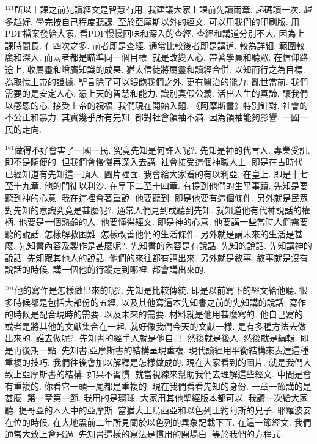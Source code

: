 \documentclass{book}
\begin{document}
$^{121}$所以上課之前先讀經文是智慧有用.
我建議大家上課前先讀兩章.
起碼讀一次.
越多越好.
學完按自己程度聽課.
至於亞摩斯以外的經文.
可以用我們的印刷版.
用PDF檔案發給大家.
看PDF慢慢回味和深入的查經.
查經和講道分別不大.
因為上課時間長.
有四次之多.
前者即是查經.
通常比較後者即是講道.
較為詳細.
範圍較廣和深入.
而兩者都是瞄準同一個目標.
就是改變人心.
帶著學員和聽眾.
在信仰路途上.
收屬靈和增廣知識的成果.
猶太信徒將屬靈和讀經合併.
以知而行之為目標.
為取悅上帝的證據.
聖言除了可以餵飽我們之外.
更有醫治的能力.
亂世當前.
我們需要的是安定人心.
憑上天的智慧和能力.
識別真假公義.
活出人生的真諦.
讓我們以感恩的心.
接受上帝的祝福.
我們現在開始入題.
《阿摩斯書》特別針對.
社會的不公正和暴力.
其實幾乎所有先知.
都對社會領袖不滿.
因為領袖能夠影響.
一國一民的走向.

$^{161}$做得不好會害了一國一民.
究竟先知是何許人呢?.
先知是神的代言人.
專業受訓.
即不是隨便的.
但我們會慢慢再深入去講.
社會接受這個神職人士.
即是在古時代.
已經知道有先知這一頂人.
圖片裡面.
我會給大家看的有以利亞.
在皇上.
即是十七至十九章.
他的門徒以利沙.
在皇下二至十四章.
有提到他們的生平事蹟.
先知是要聽到神的心意.
我在這裡會著重說.
他要聽到.
即是他要有這個條件.
另外就是民眾對先知的意識究竟是甚麼呢?.
通常人們見到或聽到先知.
就知道他有代神說話的權柄.
他要是一個熟齡的人.
他要懂得經文.
即是神的心意.
他要講一些當時人們需要聽的說話.
怎樣解救困難.
怎樣改善他們的生活條件.
另外就是講未來的生活是甚麼.
先知書內容及製作是甚麼呢?.
先知書的內容是有說話.
先知的說話.
先知講神的說話.
先知跟其他人的說話.
他們的來往都有講出來.
另外就是敘事.
敘事就是沒有說話的時候.
講一個他的行蹤走到哪裡.
都會講出來的.

$^{201}$他的寫作是怎樣做出來的呢?.
先知是比較傳統.
即是以前寫下的經文給他聽.
很多時候都是包括大部份的五經.
以及其他寫這本先知書之前的先知講的說話.
寫作的時候是配合現時的需要.
以及未來的需要.
材料就是他用甚麼寫的.
他自己寫的.
或者是將其他的文獻集合在一起.
就好像我們今天的文獻一樣.
是有多種方法去做出來的.
誰去做呢?.
先知書的經手人就是他自己.
然後就是後人.
然後就是編輯.
即是再後期一點.
先知書,亞摩斯書的結構呈現重複.
現代讀經用平衡結構來表達這種重複的技巧.
我們往後會加以解釋是怎樣做成的.
現在大家看到的圖片.
就是我們大致上亞摩斯書的結構.
如果不習慣.
就當視線來幫助我們去理解這些經文.
中間是會有重複的.
你看它一頭一尾都是重複的.
現在我們看看先知的身份.
一章一節講的是甚麼.
第一章第一節.
我用的是環球.
大家用其他聖經版本都可以.
我讀一次給大家聽.
提哥亞的木人中的亞摩斯.
當猶大王烏西亞和以色列王約阿斯的兒子.
耶羅波安在位的時候.
在大地震前二年所見關於以色列的異象記載下面.
在這一節經文.
我們通常大致上會飛過.
先知書這樣的寫法是慣用的開場白.
等於我們的方程式.
\end{document}
